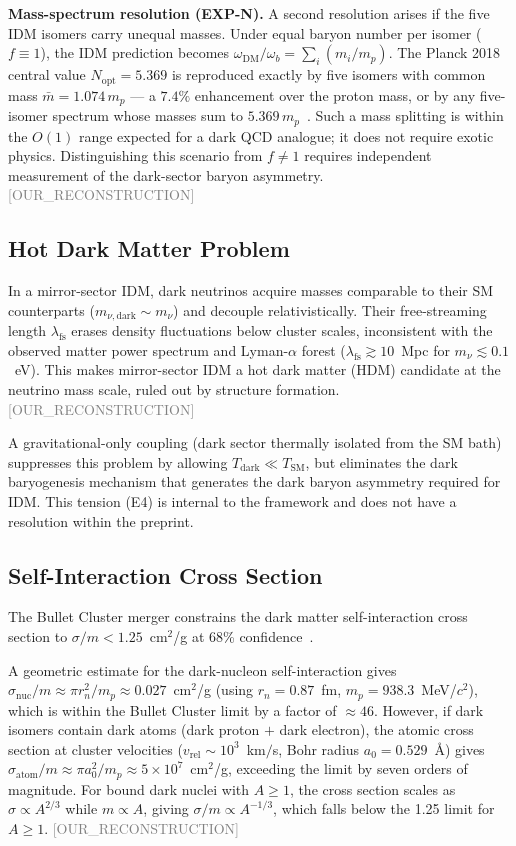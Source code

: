 \documentclass[twocolumn,prd,amsmath,amssymb,floatfix]{revtex4-2}
\newcommand{\reconstruction}{\textcolor{gray}{\small[OUR\_RECONSTRUCTION]}}
\begin{document}
\textbf{Mass-spectrum resolution (EXP-N).}
A second resolution arises if the five IDM isomers carry unequal masses.
Under equal baryon number per isomer ($f \equiv 1$), the IDM prediction
becomes $\omega_\mathrm{DM}/\omega_b = \sum_i (m_i/m_p)$.  The Planck 2018
central value $N_\mathrm{opt} = 5.369$ is reproduced exactly by five isomers
with common mass $\bar{m} = 1.074\,m_p$ --- a $7.4\%$ enhancement over the
proton mass, or by any five-isomer spectrum whose masses sum to
$5.369\,m_p$~\cite{rosa2022}.  Such a mass splitting is within the
$O(1)$ range expected for a dark QCD analogue; it does not require exotic
physics.  Distinguishing this scenario from $f \neq 1$ requires
independent measurement of the dark-sector baryon asymmetry.
\reconstruction

\subsection{Hot Dark Matter Problem}
\label{ssec:hdm}

In a mirror-sector IDM, dark neutrinos acquire masses comparable to their
SM counterparts ($m_{\nu,\mathrm{dark}} \sim m_\nu$) and decouple
relativistically.  Their free-streaming length $\lambda_\mathrm{fs}$
erases density fluctuations below cluster scales, inconsistent with
the observed matter power spectrum and Lyman-$\alpha$ forest
($\lambda_\mathrm{fs} \gtrsim 10$~Mpc for $m_\nu \lesssim 0.1$~eV).
This makes mirror-sector IDM a hot dark matter (HDM) candidate at the
neutrino mass scale, ruled out by structure formation.
\reconstruction

A gravitational-only coupling (dark sector thermally isolated from the SM
bath) suppresses this problem by allowing $T_\mathrm{dark} \ll T_\mathrm{SM}$,
but eliminates the dark baryogenesis mechanism that generates the dark baryon
asymmetry required for IDM.  This tension (E4) is internal to the framework
and does not have a resolution within the preprint.

\subsection{Self-Interaction Cross Section}
\label{ssec:sigma}

The Bullet Cluster merger constrains the dark matter self-interaction
cross section to $\sigma/m < 1.25$~cm$^2$/g at 68\% confidence~\cite{markevitch2006}.

A geometric estimate for the dark-nucleon self-interaction
gives $\sigma_\mathrm{nuc}/m \approx \pi r_n^2/m_p \approx 0.027$~cm$^2$/g
(using $r_n = 0.87$~fm, $m_p = 938.3$~MeV/$c^2$), which is within the
Bullet Cluster limit by a factor of $\approx 46$.
However, if dark isomers contain dark atoms (dark proton $+$ dark electron),
the atomic cross section at cluster velocities
($v_\mathrm{rel} \sim 10^3$~km$/$s, Bohr radius $a_0 = 0.529$~\AA)
gives $\sigma_\mathrm{atom}/m \approx \pi a_0^2 / m_p \approx 5 \times
10^7$~cm$^2$/g, exceeding the limit by seven orders of magnitude.
For bound dark nuclei with $A \ge 1$, the cross section scales as
$\sigma \propto A^{2/3}$ while $m \propto A$, giving
$\sigma/m \propto A^{-1/3}$, which falls below the 1.25 limit for $A \ge 1$.
\reconstruction
\end{document}
